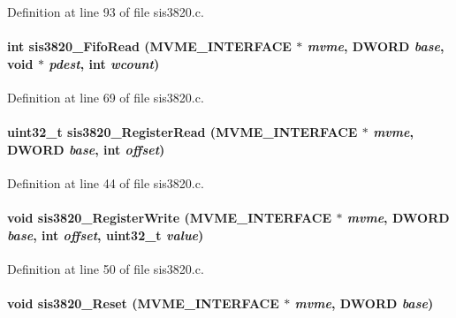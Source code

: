 Definition at line 93 of file sis3820.c.
\paragraph[{sis3820\_\-FifoRead}]{\setlength{\rightskip}{0pt plus 5cm}int sis3820\_\-FifoRead ({\bf MVME\_\-INTERFACE} $\ast$ {\em mvme}, \/  {\bf DWORD} {\em base}, \/  void $\ast$ {\em pdest}, \/  int {\em wcount})}\hfill\label{sis3820_8c_a4c633bebb10ba1fb3c9a68567c7fb3bf}


Definition at line 69 of file sis3820.c.
\paragraph[{sis3820\_\-RegisterRead}]{\setlength{\rightskip}{0pt plus 5cm}uint32\_\-t sis3820\_\-RegisterRead ({\bf MVME\_\-INTERFACE} $\ast$ {\em mvme}, \/  {\bf DWORD} {\em base}, \/  int {\em offset})}\hfill\label{sis3820_8c_aecea42f29316112f54ecae314d105ff1}


Definition at line 44 of file sis3820.c.
\paragraph[{sis3820\_\-RegisterWrite}]{\setlength{\rightskip}{0pt plus 5cm}void sis3820\_\-RegisterWrite ({\bf MVME\_\-INTERFACE} $\ast$ {\em mvme}, \/  {\bf DWORD} {\em base}, \/  int {\em offset}, \/  uint32\_\-t {\em value})}\hfill\label{sis3820_8c_a1465b6dba20d7efb0409783498376680}


Definition at line 50 of file sis3820.c.
\paragraph[{sis3820\_\-Reset}]{\setlength{\rightskip}{0pt plus 5cm}void sis3820\_\-Reset ({\bf MVME\_\-INTERFACE} $\ast$ {\em mvme}, \/  {\bf DWORD} {\em base})}\hfill\label{sis3820_8c_a50fd26e58f02c571c2a6a3bfda4b5946}


